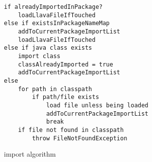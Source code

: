 \begin{figure}[htb]
\small
\begin{verbatim}
if alreadyImportedInPackage?
    loadLlavaFileIfTouched
else if existsInPackageNameMap
    addToCurrentPackageImportList
    loadLlavaFileIfTouched
else if java class exists
    import class
    classAlreadyImported = true
    addToCurrentPackageImportList
else
    for path in classpath
        if path/file exists
            load file unless being loaded
            addToCurrentPackageImportList
            break
    if file not found in classpath
        throw FileNotFoundException
\end{verbatim}
\normalsize
\caption{import algorithm}
\label{import-alrorithm}
\end{figure}
